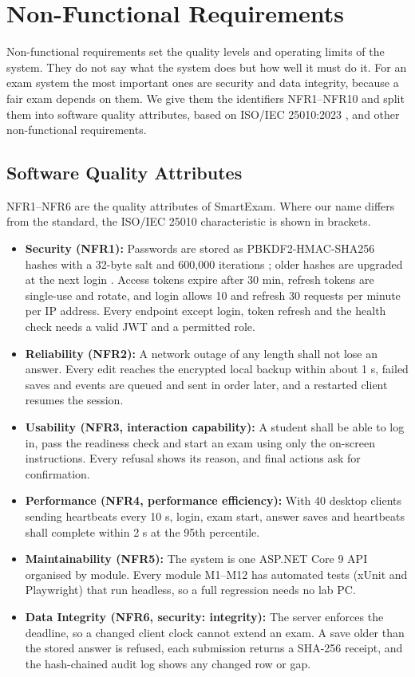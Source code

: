 \section{Non-Functional Requirements}
Non-functional requirements set the quality levels and operating limits of the system. They do not say what the system does but how well it must do it. For an exam system the most important ones are security and data integrity, because a fair exam depends on them. We give them the identifiers NFR1--NFR10 and split them into software quality attributes, based on ISO/IEC 25010:2023 \cite{iso25010}, and other non-functional requirements.

\subsection{Software Quality Attributes}
\label{sec:qualityattributes}
NFR1--NFR6 are the quality attributes of SmartExam. Where our name differs from the standard, the ISO/IEC 25010 characteristic is shown in brackets.
\begin{itemize}
    \item \textbf{Security (NFR1):} Passwords are stored as PBKDF2-HMAC-SHA256 hashes with a 32-byte salt and 600,000 iterations \cite{owasp_pwd}; older hashes are upgraded at the next login \cite{nist80063b}. Access tokens expire after 30 min, refresh tokens are single-use and rotate, and login allows 10 and refresh 30 requests per minute per IP address. Every endpoint except login, token refresh and the health check needs a valid JWT \cite{rfc7519} and a permitted role.
    \item \textbf{Reliability (NFR2):} A network outage of any length shall not lose an answer. Every edit reaches the encrypted local backup within about 1 s, failed saves and events are queued and sent in order later, and a restarted client resumes the session.
    \item \textbf{Usability (NFR3, interaction capability):} A student shall be able to log in, pass the readiness check and start an exam using only the on-screen instructions. Every refusal shows its reason, and final actions ask for confirmation.
    \item \textbf{Performance (NFR4, performance efficiency):} With 40 desktop clients sending heartbeats every 10 s, login, exam start, answer saves and heartbeats shall complete within 2 s at the 95th percentile.
    \item \textbf{Maintainability (NFR5):} The system is one ASP.NET Core 9 API organised by module. Every module M1--M12 has automated tests (xUnit and Playwright) that run headless, so a full regression needs no lab PC.
    \item \textbf{Data Integrity (NFR6, security: integrity):} The server enforces the deadline, so a changed client clock cannot extend an exam. A save older than the stored answer is refused, each submission returns a SHA-256 receipt, and the hash-chained audit log shows any changed row or gap.
\end{itemize}


